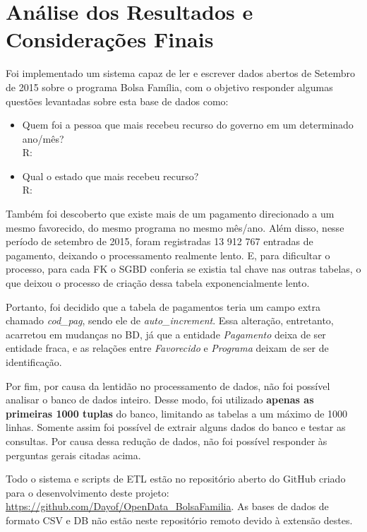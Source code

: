 \documentclass[12pt]{article}
\begin{document}
	\section{Análise dos Resultados e Considerações Finais}
	\label{sec:resultados}
	
	Foi implementado um sistema capaz de ler e escrever dados abertos de Setembro de 2015 sobre o programa Bolsa Família, com o objetivo responder algumas questões levantadas sobre esta base de dados como:
	
	\begin{itemize}
		\item Quem foi a pessoa que mais recebeu  recurso do governo em um determinado ano/mês? \\
		R: 
		\item Qual o estado que mais recebeu recurso? \\
		R: 
	\end{itemize}
	
	Também foi descoberto que existe mais de um pagamento direcionado a um mesmo favorecido, do mesmo programa no mesmo mês/ano. Além disso, nesse período de setembro de 2015, foram registradas 13 912 767 entradas de pagamento, deixando o processamento realmente lento. E, para dificultar o processo, para cada FK o SGBD conferia se existia tal chave nas outras tabelas, o que deixou o processo de criação dessa tabela exponencialmente lento.
	
	Portanto, foi decidido que a tabela de pagamentos teria um campo extra chamado \emph{cod{\_}pag}, sendo ele de \emph{auto{\_}increment}. Essa alteração, entretanto, acarretou em mudanças no BD, já que a entidade \emph{Pagamento} deixa de ser entidade fraca, e as relações entre \emph{Favorecido} e \emph{Programa} deixam de ser de identificação.
	
	Por fim, por causa da lentidão no processamento de dados, não foi possível analisar o banco de dados inteiro. Desse modo, foi utilizado \textbf{apenas as primeiras 1000 tuplas} do banco, limitando as tabelas a um máximo de 1000 linhas. Somente assim foi possível de extrair alguns dados do banco e testar as consultas. Por causa dessa redução de dados, não foi possível responder às perguntas gerais citadas acima.
	
	Todo o sistema e scripts de ETL estão no repositório aberto do GitHub criado para o desenvolvimento deste projeto: \url{https://github.com/Dayof/OpenData_BolsaFamilia}. As bases de dados de formato CSV e DB não estão neste repositório remoto devido à extensão destes.
	

 

	
\end{document}
